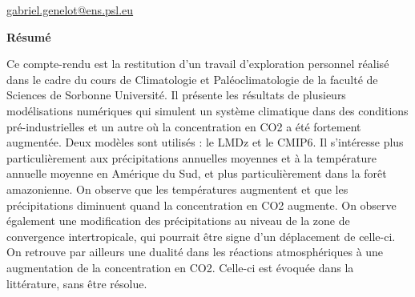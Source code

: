 \begin{titlepage}

\begin{center}

{\makeatletter
\largetitlestyle\fontsize{45}{45}\selectfont\@title
\makeatother}

{\makeatletter
\ifdefvoid{\@subtitle}{}{\bigskip\titlestyle\fontsize{20}{20}\selectfont\@subtitle}
\makeatother}


\bigskip
\bigskip

{\makeatletter
\largetitlestyle\fontsize{25}{25}\selectfont\@author
\makeatother}

\bigskip

\href{mailto:gabriel.genelot@ens.psl.eu}{gabriel.genelot@ens.psl.eu}

\bigskip
\bigskip


\vfill

\textbf{Résumé} \\

\begin{center}
\justify


Ce compte-rendu est la restitution d'un travail d'exploration personnel réalisé dans le cadre du cours de Climatologie et Paléoclimatologie de la faculté de Sciences de Sorbonne Université. Il présente les résultats de plusieurs modélisations numériques qui simulent un système climatique dans des conditions pré-industrielles et un autre où la concentration en CO2 a été fortement augmentée. Deux modèles sont utilisés : le LMDz et le CMIP6. Il s'intéresse plus particulièrement aux précipitations annuelles moyennes et à la température annuelle moyenne en Amérique du Sud, et plus particulièrement dans la forêt amazonienne. On observe que les températures augmentent et que les précipitations diminuent quand la concentration en CO2 augmente. On observe également une modification des précipitations au niveau de la zone de convergence intertropicale, qui pourrait être signe d'un déplacement de celle-ci. On retrouve par ailleurs une dualité dans les réactions atmosphériques à une augmentation de la concentration en CO2. Celle-ci est évoquée dans la littérature, sans être résolue. 


\end{center}
\end{center}
\end{titlepage}
